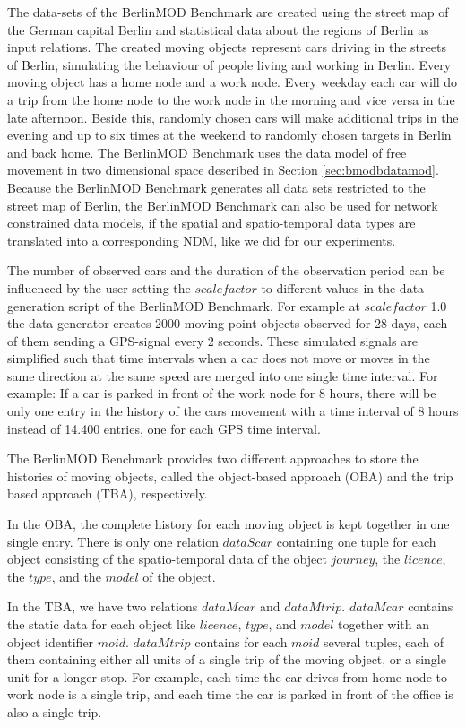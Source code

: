 \documentclass[a4paper]{article}
\newcommand{\bmodb} {BerlinMOD Benchmark}
\begin{document}
The data-sets of the \bmodb{} are created using the street map of the German
capital Berlin \cite{bbike} and statistical data about the regions of Berlin
\cite{bevberlin,berlinstadtatlas} as input relations.
The created moving objects represent cars driving in the streets of Berlin,
simulating the behaviour of people living and working in Berlin.
Every moving object has a home node and a work node. Every weekday each car will
do a trip from the home node to the work node in the morning and vice versa
in the late afternoon. Beside this, randomly chosen cars will make additional
trips in the evening and up to six times at the weekend to randomly chosen
targets in Berlin and back home. The \bmodb{} uses the data model of free movement in two
dimensional space described in Section \ref{sec:bmodbdatamod}. Because the \bmodb{}
generates all data sets restricted to the street map of Berlin, the \bmodb{} can
also be used for network constrained data models, if the spatial and spatio-temporal
data types are translated into a corresponding NDM, like we did
for our experiments.

The number of observed cars and the duration of the observation period can be
influenced by the user setting the $scalefactor$ to different values in the data
generation script of the \bmodb{}. For example at $scalefactor$ 1.0 the data generator
creates 2000 moving point objects observed for 28 days, each of them sending a
GPS-signal every 2 seconds. These simulated signals are simplified such that time
intervals when a car does not move or moves in the same direction at the same
speed are merged into one single time interval. For example: If a car is parked in front
of the work node for 8 hours, there will be only one entry in the history of the
cars movement with a time interval of 8 hours instead of 14.400 entries,
one for each GPS time interval.

The \bmodb{} provides two different approaches to store the histories of moving
objects, called the object-based approach (OBA) and the trip based approach (TBA),
respectively.

In the OBA, the complete history for each moving object is kept together in one
single entry. There is only one relation $dataScar$
containing one tuple for each object consisting of the spatio-temporal data of
the object $journey$, the $licence$, the $type$, and the $model$ of the object.

In the TBA, we have two relations $dataMcar$ and $dataMtrip$. $dataMcar$ contains
the static data for each object like $licence$, $type$, and $model$ together with
an object identifier $moid$. $dataMtrip$ contains for each $moid$ several tuples,
each of them containing either all units of a single trip of the moving object, or a
single unit for a longer stop. For example, each time the car drives from home node
to work node is a single trip, and each time the car is parked in front of the office
is also a single trip.
\end{document}
